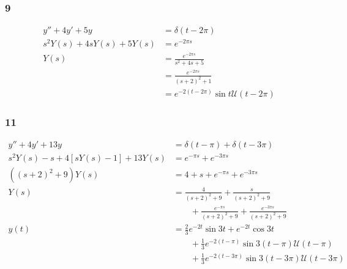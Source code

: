 \documentclass{article}
\begin{document}
\subsubsection{9}

\begin{align*}
  y'' + 4 y' + 5 y             & = \delta(t - 2 \pi)                                \\
  s^2 Y(s) + 4 s Y(s) + 5 Y(s) & = e^{-2 \pi s}                                     \\
  Y(s)                         & = \frac{e^{-2 \pi s}}{s^2 + 4 s + 5}               \\
                               & = \frac{e^{-2 \pi s}}{(s + 2)^2 + 1}               \\
                               & = e^{-2 (t - 2 \pi)} \sin t \mathcal{U}(t - 2 \pi)
\end{align*}

\subsubsection{11}

\begin{align*}
  y'' + 4 y' + 13 y                       & = \delta(t - \pi) + \delta(t - 3 \pi)                                              \\
  s^2 Y(s) - s + 4 [s Y(s) - 1] + 13 Y(s) & = e^{-\pi s} + e^{-3 \pi s}                                                        \\
  ((s + 2)^2 + 9) Y(s)                    & = 4 + s + e^{-\pi s} + e^{-3 \pi s}                                                \\
  Y(s)                                    & = \frac{4}{(s + 2)^2 + 9} + \frac{s}{(s + 2)^2 + 9}                                \\
                                          & \qquad + \frac{e^{-\pi s}}{(s + 2)^2 + 9} + \frac{e^{-3 \pi s}}{(s + 2)^2 + 9}     \\
  y(t)                                    & = \frac{2}{3} e^{-2 t} \sin 3 t + e^{-2 t} \cos 3 t                                \\
                                          & \qquad + \frac{1}{3} e^{-2 (t - \pi)} \sin 3 (t - \pi) \mathcal{U} (t - \pi)       \\
                                          & \qquad + \frac{1}{3} e^{-2 (t - 3 \pi)} \sin 3 (t - 3 \pi) \mathcal{U} (t - 3 \pi)
\end{align*}
\end{document}
